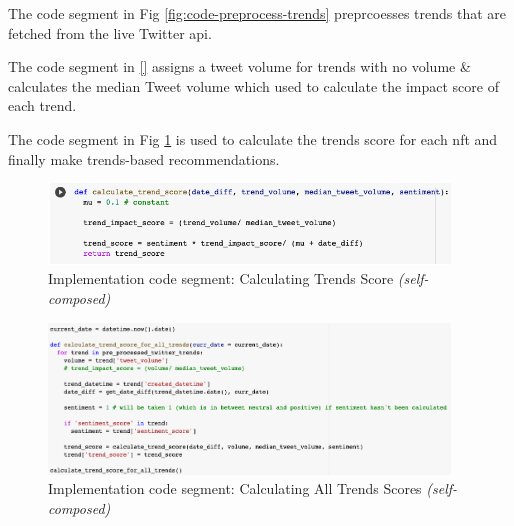 The code segment in Fig \ref{fig:code-preprocess-trends} preprcoesses trends that are fetched from the live Twitter \gls{api}.



The code segment in \ref{} assigns a tweet volume for trends with no volume \& calculates the median Tweet volume which used to calculate the impact score of each trend.

The code segment in Fig \ref{fig:code-trends-score-func} is used to calculate the trends score for each \gls{nft} and finally make trends-based recommendations.

\begin{figure}[h!]
\centering
\includegraphics[width=0.95\textwidth]{images/Implementation/code/calculate trend-score func.png}
\caption{Implementation code segment: Calculating Trends Score \textit{(self-composed)}}
\label{fig:code-trends-score-func}
\end{figure}

\begin{figure}[h!]
\centering
\includegraphics[width=0.95\textwidth]{images/Implementation/code/calculate trend-score 2.png}
\caption{Implementation code segment: Calculating All Trends Scores \textit{(self-composed)}}
\label{fig:code-trends-score}
\end{figure}

